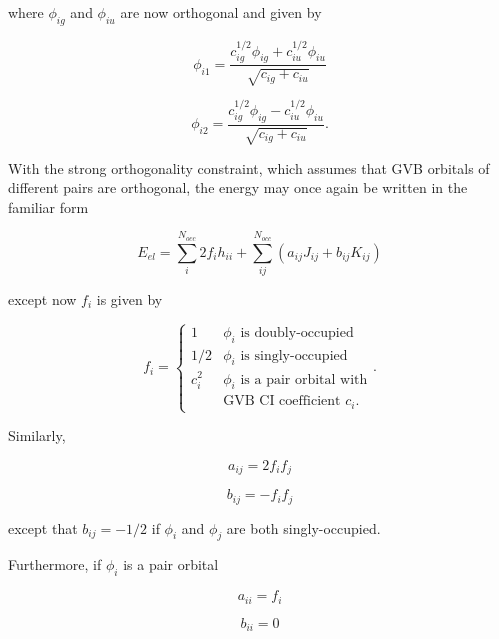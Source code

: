 \noindent where $\phi_{ig}$ and $\phi_{iu}$ are now orthogonal and
given by

\begin{equation}
   \phi_{i1} = \frac{c_{ig}^{1/2}\phi_{ig}+c_{iu}^{1/2}\phi_{iu}}
	{\sqrt{c_{ig}+c_{iu}}}
\end{equation}

\begin{equation}
   \phi_{i2} = \frac{c_{ig}^{1/2}\phi_{ig}-c_{iu}^{1/2}\phi_{iu}}
	{\sqrt{c_{ig}+c_{iu}}}.
\end{equation}

\noindent With the strong orthogonality constraint, which assumes that GVB
orbitals of different pairs are orthogonal, the energy may
once again be written in the familiar form

\begin{equation}
   E_{el} = \sum_i^{N_{occ}}2f_ih_{ii} + \sum_{ij}^{N_{occ}}
	(a_{ij}J_{ij} + b_{ij}K_{ij})
\end{equation}

\noindent except now $f_i$ is given by \cite{Bobrowicz77} 

\begin{equation}
	f_i = \left\{\begin{array}{ll}
		1 & \mbox{$\phi_i$ is doubly-occupied} \\
		1/2 & \mbox{$\phi_i$ is singly-occupied} \\
		c_i^2 &   \mbox{$\phi_i$ is a pair orbital with} \\
		      & \mbox{GVB CI coefficient $c_i$}.  
		\end{array}\right. .
\end{equation}

\noindent Similarly, 

\begin{equation}
	a_{ij} = 2f_if_j 
\end{equation}

\begin{equation}
	b_{ij} = -f_if_j 
\end{equation}

\noindent except that $b_{ij} = -1/2$ if $\phi_i$ and $\phi_j$ are
both singly-occupied.

Furthermore, if $\phi_i$ is a pair orbital

\begin{equation}
	a_{ii} = f_i
\end{equation}

\begin{equation}
	b_{ii} = 0
\end{equation}

